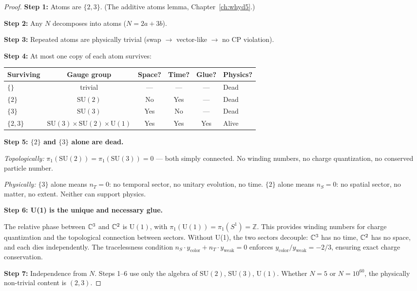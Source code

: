 \begin{proof}
\textbf{Step 1:} Atoms are $\{2, 3\}$. (The additive atoms lemma, Chapter~\ref{ch:whyd5}.)

\textbf{Step 2:} Any $N$ decomposes into atoms ($N = 2a + 3b$).

\textbf{Step 3:} Repeated atoms are physically trivial (swap $\to$ vector-like $\to$ no CP violation).

\textbf{Step 4:} At most one copy of each atom survives:

\begin{center}
\begin{tabular}{lccccl}
\hline
Surviving & Gauge group & Space? & Time? & Glue? & Physics? \\
\hline
$\{\}$ & trivial & --- & --- & --- & Dead \\
$\{2\}$ & $\text{SU}(2)$ & No & Yes & --- & Dead \\
$\{3\}$ & $\text{SU}(3)$ & Yes & No & --- & Dead \\
$\{2, 3\}$ & $\text{SU}(3)\!\times\!\text{SU}(2)\!\times\!\text{U}(1)$ & Yes & Yes & Yes & Alive \\
\hline
\end{tabular}
\end{center}

\textbf{Step 5: $\{2\}$ and $\{3\}$ alone are dead.}

\emph{Topologically:} $\pi_1(\text{SU}(2)) = \pi_1(\text{SU}(3)) = 0$ --- both simply connected. No winding numbers, no charge quantization, no conserved particle number.

\emph{Physically:} $\{3\}$ alone means $n_T = 0$: no temporal sector, no unitary evolution, no time. $\{2\}$ alone means $n_S = 0$: no spatial sector, no matter, no extent. Neither can support physics.

\textbf{Step 6: U(1) is the unique and necessary glue.}

The relative phase between $\mathbb{C}^3$ and $\mathbb{C}^2$ is $\text{U}(1)$, with $\pi_1(\text{U}(1)) = \pi_1(S^1) = \mathbb{Z}$. This provides winding numbers for charge quantization and the topological connection between sectors. Without U(1), the two sectors decouple: $\mathbb{C}^3$ has no time, $\mathbb{C}^2$ has no space, and each dies independently. The tracelessness condition $n_S \cdot y_\text{color} + n_T \cdot y_\text{weak} = 0$ enforces $y_\text{color}/y_\text{weak} = -2/3$, ensuring exact charge conservation.

\textbf{Step 7:} Independence from $N$. Steps 1--6 use only the algebra of $\text{SU}(2)$, $\text{SU}(3)$, $\text{U}(1)$. Whether $N = 5$ or $N = 10^{60}$, the physically non-trivial content is $(2, 3)$.
\end{proof}

